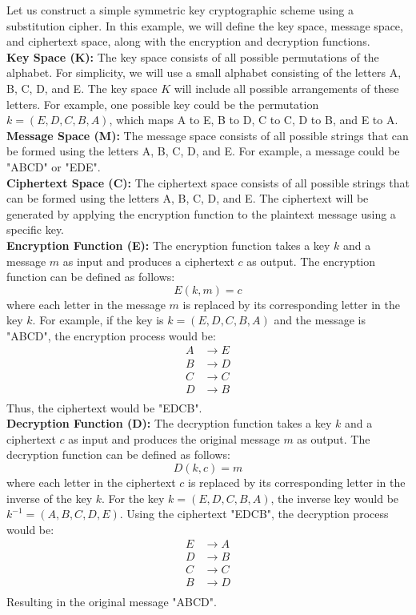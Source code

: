 \documentclass[openany]{book}
\begin{document}
\begin{example}
    Let us construct a simple symmetric key cryptographic scheme using a substitution cipher. In this example, we will define the key space, message space, and ciphertext space, along with the encryption and decryption functions. \\
    \textbf{Key Space (K):} The key space consists of all possible permutations of the alphabet. For simplicity, we will use a small alphabet consisting of the letters A, B, C, D, and E. The key space \( K \) will include all possible arrangements of these letters. For example, one possible key could be the permutation \( k = (E, D, C, B, A) \), which maps A to E, B to D, C to C, D to B, and E to A. \\
    \textbf{Message Space (M):} The message space consists of all possible strings that can be formed using the letters A, B, C, D, and E. For example, a message could be "ABCD" or "EDE". \\
    \textbf{Ciphertext Space (C):} The ciphertext space consists of all possible strings that can be formed using the letters A, B, C, D, and E. The ciphertext will be generated by applying the encryption function to the plaintext message using a specific key. \\
    \textbf{Encryption Function (E):} The encryption function takes a key \( k \) and a message \( m \) as input and produces a ciphertext \( c \) as output. The encryption function can be defined as follows:
    $$ E(k, m) = c $$
    where each letter in the message \( m \) is replaced by its corresponding letter in the key \( k \). For example, if the key is \( k = (E, D, C, B, A) \) and the message is "ABCD", the encryption process would be:
    \begin{align*}
        A &\rightarrow E \\
        B &\rightarrow D \\
        C &\rightarrow C \\
        D &\rightarrow B \\
    \end{align*}
    Thus, the ciphertext would be "EDCB". \\
    \textbf{Decryption Function (D):} The decryption function takes a key \( k \) and a ciphertext \( c \) as input and produces the original message \( m \) as output. The decryption function can be defined as follows:
    $$ D(k, c) = m $$
    where each letter in the ciphertext \( c \) is replaced by its corresponding letter in the inverse of the key \( k \). For the key \( k = (E, D, C, B, A) \), the inverse key would be \( k^{-1} = (A, B, C, D, E) \). Using the ciphertext "EDCB", the decryption process would be:
    \begin{align*}
        E &\rightarrow A \\
        D &\rightarrow B \\
        C &\rightarrow C \\
        B &\rightarrow D \\
    \end{align*}
    Resulting in the original message "ABCD". \\
\end{example}
\end{document}
